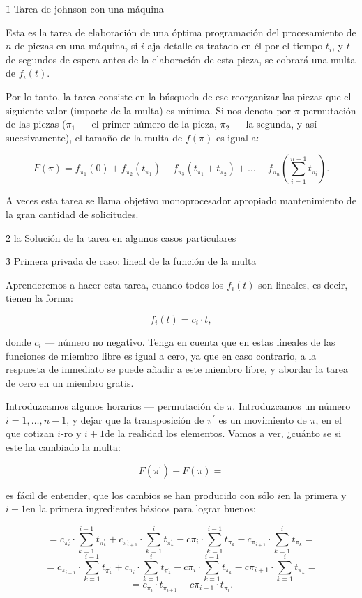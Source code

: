 \h1{ Tarea de johnson con una máquina }

Esta es la tarea de elaboración de una óptima programación del procesamiento de $n$ de piezas en una máquina, si $i$-aja detalle es tratado en él por el tiempo $t_i$, y $t$ de segundos de espera antes de la elaboración de esta pieza, se cobrará una multa de $f_i(t)$.

Por lo tanto, la tarea consiste en la búsqueda de ese reorganizar las piezas que el siguiente valor (importe de la multa) es mínima. Si nos denota por $\pi$ permutación de las piezas ($\pi_1$ --- el primer número de la pieza, $\pi_2$ --- la segunda, y así sucesivamente), el tamaño de la multa de $f(\pi)$ es igual a:

$$ F(\pi) = f_{\pi_1}(0) + f_{\pi_2}(t_{\pi_1}) + f_{\pi_3}(t_{\pi_1} + t_{\pi_2}) + \ldots + f_{\pi_n}\left(\sum_{i=1}^{n-1} t_{\pi_i}\right). $$

A veces esta tarea se llama objetivo monoprocesador apropiado mantenimiento de la gran cantidad de solicitudes.


\h2{ la Solución de la tarea en algunos casos particulares }


\h3{ Primera privada de caso: lineal de la función de la multa }

Aprenderemos a hacer esta tarea, cuando todos los $f_i(t)$ son lineales, es decir, tienen la forma:

$$ f_i(t) = c_i \cdot t, $$

donde $c_i$ --- número no negativo. Tenga en cuenta que en estas lineales de las funciones de miembro libre es igual a cero, ya que en caso contrario, a la respuesta de inmediato se puede añadir a este miembro libre, y abordar la tarea de cero en un miembro gratis.

Introduzcamos algunos horarios --- permutación de $\pi$. Introduzcamos un número $i=1, \ldots, n-1$, y dejar que la transposición de $\pi^\prime$ es un movimiento de $\pi$, en el que cotizan $i$-ro y $i+1$de la realidad los elementos. Vamos a ver, ¿cuánto se si este ha cambiado la multa:

$$ F(\pi^\prime) - F(\pi) = $$

es fácil de entender, que los cambios se han producido con sólo $i$en la primera y $i+1$en la primera ingredientes básicos para lograr buenos:

$$ = c_{\pi^\prime_i} \cdot \sum_{k=1}^{i-1} t_{\pi^\prime_k} + c_{\pi^\prime_{i+1}} \cdot \sum_{k=1}^{i} t_{\pi^\prime_k} - c{\pi_i} \cdot \sum_{k=1}^{i-1} t_{\pi_k} - c_{\pi_{i+1}} \cdot \sum_{k=1}^{i} t_{\pi_k} = $$
$$ = c_{\pi_{i+1}} \cdot \sum_{k=1}^{i-1} t_{\pi^\prime_k} + c_{\pi_i} \cdot \sum_{k=1}^{i} t_{\pi_k^\prime} - c{\pi_i} \cdot \sum_{k=1}^{i-1} t_{\pi_k} - c{\pi_{i+1}} \cdot \sum_{k=1}^{i} t_{\pi_k} = $$
$$ = c_{\pi_i} \cdot t_{\pi_{i+1}} - c{\pi_{i+1}} \cdot t_{\pi_i}. $$

